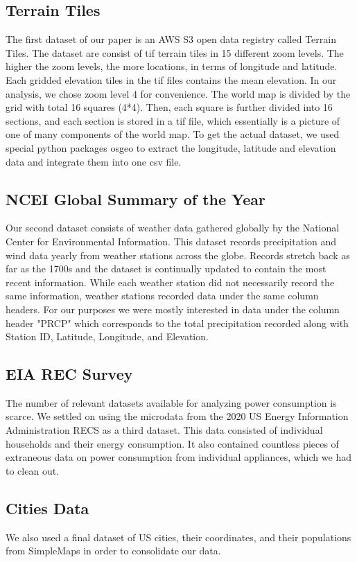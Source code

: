 \documentclass[11pt]{article}
\begin{document}
\subsection{Terrain Tiles}
The first dataset of our paper is an AWS S3 open data registry called Terrain Tiles. The dataset are consist of tif terrain tiles in 15 different zoom levels. The higher the zoom levels, the more locations, in terms of longitude and latitude. Each gridded elevation tiles in the tif files contains the mean elevation. In our analysis, we chose zoom level 4 for convenience. The world map is divided by the grid with total 16 squares (4*4). Then, each square is further divided into 16 sections, and each section is stored in a tif file, which essentially is a picture of one of many components of the world map. To get the actual dataset, we used special python packages osgeo to extract the longitude, latitude and elevation data and integrate them into one csv file.
\subsection{NCEI Global Summary of the Year}
Our second dataset consists of weather data gathered globally by the National Center for Environmental Information. This dataset records precipitation and wind data yearly from weather stations across the globe. Records stretch back as far as the 1700s and the dataset is continually updated to contain the most recent information. While each weather station did not necessarily record the same information, weather stations recorded data under the same column headers. For our purposes we were mostly interested in data under the column header "PRCP" which corresponds to the total precipitation recorded along with Station ID, Latitude, Longitude, and Elevation.
\subsection{EIA REC Survey}
The number of relevant datasets available for analyzing power consumption is scarce. We settled on using the microdata from the 2020 US Energy Information Administration RECS as a third dataset. This data consisted of individual households and their energy consumption. It also contained countless pieces of extraneous data on power consumption from individual appliances, which we had to clean out. 
\subsection{Cities Data}
We also used a final dataset of US cities, their coordinates, and their populations from SimpleMaps in order to consolidate our data. 
\end{document}
